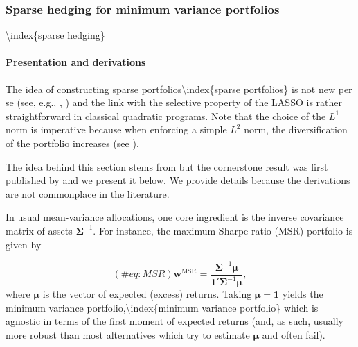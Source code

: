 \subsubsection{Sparse hedging for minimum variance portfolios}

{\textbackslash}index\{sparse hedging\}

\paragraph{Presentation and derivations}

The idea of constructing sparse portfolios{\textbackslash}index\{sparse portfolios\} is not new per se (see, e.g., \cite{brodie2009sparse}, \cite{fastrich2015constructing}) and the link with the selective property of the LASSO is rather straightforward in classical quadratic programs. Note that the choice of the $L^1$ norm is imperative because when enforcing a simple $L^2$ norm, the diversification of the portfolio increases (see \cite{coqueret2015diversified}).

The idea behind this section stems from \cite{goto2015improving} but the cornerstone result was first published by \cite{stevens1998inverse} and we present it below. We provide details because the derivations are not commonplace in the literature.

In usual mean-variance allocations, one core ingredient is the inverse covariance matrix of assets $\mathbf{\Sigma}^{ -1}$. For instance, the maximum Sharpe ratio (MSR) portfolio is given by

\begin{equation}
(\#eq:MSR)
\mathbf{w}^{\text{MSR}}=\frac{\mathbf{\Sigma}^{-1}\boldsymbol{\mu}}{\mathbf{1}'\mathbf{\Sigma}^{-1}\boldsymbol{\mu}},
\end{equation}
where $\mathbf{\mu}$ is the vector of expected (excess) returns. Taking $\mathbf{\mu}=\mathbf{1}$ yields the minimum variance portfolio,{\textbackslash}index\{minimum variance portfolio\} which is agnostic in terms of the first moment of expected returns (and, as such, usually more robust than most alternatives which try to estimate $\boldsymbol{\mu}$ and often fail).

